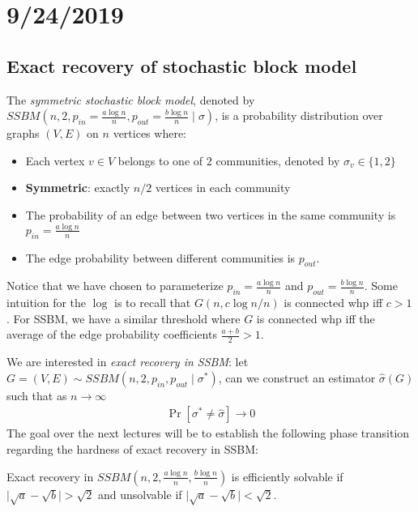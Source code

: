 \section{9/24/2019}

\subsection{Exact recovery of stochastic block model}

\begin{definition}
  \label{def:9-24-ssbm}
  The \emph{symmetric stochastic block model}, denoted by
  $SSBM(n, 2, p_{in} = \frac{a \log n}{n}, p_{out} = \frac{b \log n}{n} \mid \sigma)$,
  is a probability distribution over graphs $(V, E)$
  on $n$ vertices where:
  \begin{itemize}
    \item Each vertex $v \in V$ belongs to one of $2$ communities, denoted
      by $\sigma_v \in \{1,2\}$
    \item \textbf{Symmetric}: exactly $n/2$ vertices in each community
    \item The probability of an edge between two vertices in the
      same community is $p_{in} = \frac{a \log n}{n}$
    \item The edge probability between different communities
      is $p_{out}$.
  \end{itemize}
\end{definition}

Notice that we have chosen to parameterize $p_{in} = \frac{a \log n}{n}$
and $p_{out} = \frac{b \log n}{n}$.
Some intuition for the $\log$ is to recall that $G(n, c \log n / n)$ is
connected whp iff $c > 1$.
For SSBM, we have a similar threshold where $G$ is connected whp iff
the average of the edge probability coefficients $\frac{a+b}{2} > 1$.

We are interested in \emph{exact recovery in SSBM}: let
$G = (V, E) \sim SSBM(n, 2, p_{in}, p_{out} \mid \sigma^*)$,
can we construct an estimator $\hat\sigma(G)$ such that
as $n \to \infty$
\begin{align}
  \Pr[\sigma^* \neq \hat\sigma] \to 0
\end{align}
The goal over the next lectures will be to establish the following
phase transition regarding the hardness of exact recovery in SSBM:

\begin{theorem}
  Exact recovery in $SSBM(n, 2, \frac{a \log n}{n}, \frac{b \log n}{n})$
  is efficiently solvable if $\lvert \sqrt{a} - \sqrt{b} \rvert > \sqrt{2}$
  and unsolvable if $\lvert \sqrt{a} - \sqrt{b} \rvert < \sqrt{2}$.
\end{theorem}

